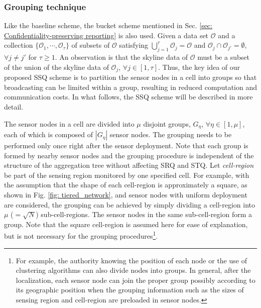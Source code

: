 \documentclass[conference]{IEEEtran}
\begin{document}
\subsubsection{Grouping technique}\label{sec: Grouping technique}
Like the baseline scheme, the bucket scheme mentioned in Sec. \ref{sec: Confidentiality-preserving reporting} is also used. Given a data set $\mathcal{O}$ and a collection $\{\mathcal{O}_1, \cdots, \mathcal{O}_{\tau}\}$ of subsets of $\mathcal{O}$ satisfying $\bigcup_{j=1}^{\tau}\mathcal{O}_j=\mathcal{O}$ and $\mathcal{O}_j\cap \mathcal{O}_{j'}=\emptyset$, $\forall j\neq j'$ for $\tau\geq 1$. An observation is that the skyline data of $\mathcal{O}$ must be a subset of the union of the skyline data of $\mathcal{O}_j$, $\forall j\in[1,\tau]$. Thus, the key idea of our proposed SSQ scheme is to partition the sensor nodes in a cell into groups so that broadcasting can be limited within a group, resulting in reduced computation and communication costs. In what follows, the SSQ scheme will be described in more detail.

The sensor nodes in a cell are divided into $\mu$ disjoint groups, $G_{\eta}$, $\forall \eta\in[1,\mu]$, each of which is composed of $|G_{\eta}|$ sensor nodes. The grouping needs to be performed only once right after the sensor deployment. Note that each group is formed by nearby sensor nodes and the grouping procedure is independent of the structure of the aggregation tree without affecting SRQ and STQ. Let \emph{cell-region} be part of the sensing region monitored by one specified cell. For example, with the assumption that the shape of each cell-region is approximately a square, as shown in Fig. \ref{fig: tiered_network}, and sensor nodes with uniform deployment are considered, the grouping can be achieved by simply dividing a cell-region into $\mu$ ($=\sqrt{N}$) sub-cell-regions. The sensor nodes in the same sub-cell-region form a group. Note that the square cell-region is assumed here for ease of explanation, but is not necessary for the grouping procedures\footnote{For example, the authority knowing the position of each node or the use of clustering algorithms can also divide nodes into groups. In general, after the localization, each sensor node can join the proper group possibly according to its geographic position when the grouping information such as the sizes of sensing region and cell-region are preloaded in sensor nodes.}.
\end{document}
